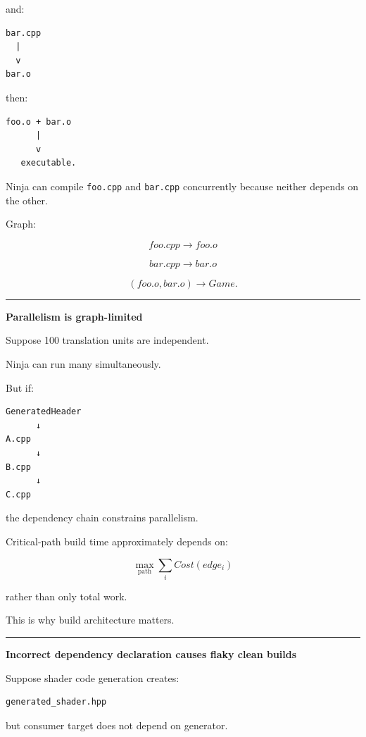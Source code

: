and:

\begin{verbatim}
bar.cpp
  |
  v
bar.o
\end{verbatim}

then:

\begin{verbatim}
foo.o + bar.o
      |
      v
   executable.
\end{verbatim}

Ninja can compile \texttt{foo.cpp} and \texttt{bar.cpp} concurrently because neither depends on the other.

Graph:

\[
foo.cpp\rightarrow foo.o
\]

\[
bar.cpp\rightarrow bar.o
\]

\[
(foo.o,bar.o)\rightarrow Game.
\]

\begin{center}\rule{0.5\linewidth}{0.5pt}\end{center}

\textbf{Parallelism is graph-limited}

Suppose 100 translation units are independent.

Ninja can run many simultaneously.

But if:

\begin{verbatim}
GeneratedHeader
      ↓
A.cpp
      ↓
B.cpp
      ↓
C.cpp
\end{verbatim}

the dependency chain constrains parallelism.

Critical-path build time approximately depends on:

\[
\boxed{
\max_{\text{path}}
\sum_i Cost(edge_i)
}
\]

rather than only total work.

This is why build architecture matters.

\begin{center}\rule{0.5\linewidth}{0.5pt}\end{center}

\textbf{Incorrect dependency declaration causes flaky clean builds}

Suppose shader code generation creates:

\begin{verbatim}
generated_shader.hpp
\end{verbatim}

but consumer target does not depend on generator.

